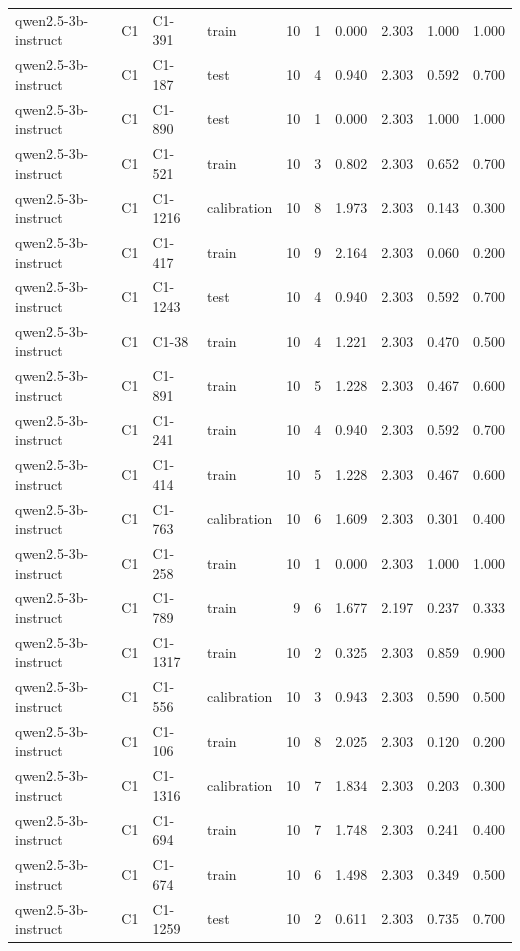 \begin{table}
\begin{tabular}{llllrrrrrr}
qwen2.5-3b-instruct & C1 & C1-391 & train & 10 & 1 & 0.000 & 2.303 & 1.000 & 1.000 \\
qwen2.5-3b-instruct & C1 & C1-187 & test & 10 & 4 & 0.940 & 2.303 & 0.592 & 0.700 \\
qwen2.5-3b-instruct & C1 & C1-890 & test & 10 & 1 & 0.000 & 2.303 & 1.000 & 1.000 \\
qwen2.5-3b-instruct & C1 & C1-521 & train & 10 & 3 & 0.802 & 2.303 & 0.652 & 0.700 \\
qwen2.5-3b-instruct & C1 & C1-1216 & calibration & 10 & 8 & 1.973 & 2.303 & 0.143 & 0.300 \\
qwen2.5-3b-instruct & C1 & C1-417 & train & 10 & 9 & 2.164 & 2.303 & 0.060 & 0.200 \\
qwen2.5-3b-instruct & C1 & C1-1243 & test & 10 & 4 & 0.940 & 2.303 & 0.592 & 0.700 \\
qwen2.5-3b-instruct & C1 & C1-38 & train & 10 & 4 & 1.221 & 2.303 & 0.470 & 0.500 \\
qwen2.5-3b-instruct & C1 & C1-891 & train & 10 & 5 & 1.228 & 2.303 & 0.467 & 0.600 \\
qwen2.5-3b-instruct & C1 & C1-241 & train & 10 & 4 & 0.940 & 2.303 & 0.592 & 0.700 \\
qwen2.5-3b-instruct & C1 & C1-414 & train & 10 & 5 & 1.228 & 2.303 & 0.467 & 0.600 \\
qwen2.5-3b-instruct & C1 & C1-763 & calibration & 10 & 6 & 1.609 & 2.303 & 0.301 & 0.400 \\
qwen2.5-3b-instruct & C1 & C1-258 & train & 10 & 1 & 0.000 & 2.303 & 1.000 & 1.000 \\
qwen2.5-3b-instruct & C1 & C1-789 & train & 9 & 6 & 1.677 & 2.197 & 0.237 & 0.333 \\
qwen2.5-3b-instruct & C1 & C1-1317 & train & 10 & 2 & 0.325 & 2.303 & 0.859 & 0.900 \\
qwen2.5-3b-instruct & C1 & C1-556 & calibration & 10 & 3 & 0.943 & 2.303 & 0.590 & 0.500 \\
qwen2.5-3b-instruct & C1 & C1-106 & train & 10 & 8 & 2.025 & 2.303 & 0.120 & 0.200 \\
qwen2.5-3b-instruct & C1 & C1-1316 & calibration & 10 & 7 & 1.834 & 2.303 & 0.203 & 0.300 \\
qwen2.5-3b-instruct & C1 & C1-694 & train & 10 & 7 & 1.748 & 2.303 & 0.241 & 0.400 \\
qwen2.5-3b-instruct & C1 & C1-674 & train & 10 & 6 & 1.498 & 2.303 & 0.349 & 0.500 \\
qwen2.5-3b-instruct & C1 & C1-1259 & test & 10 & 2 & 0.611 & 2.303 & 0.735 & 0.700 \\

\end{tabular}
\end{table}
